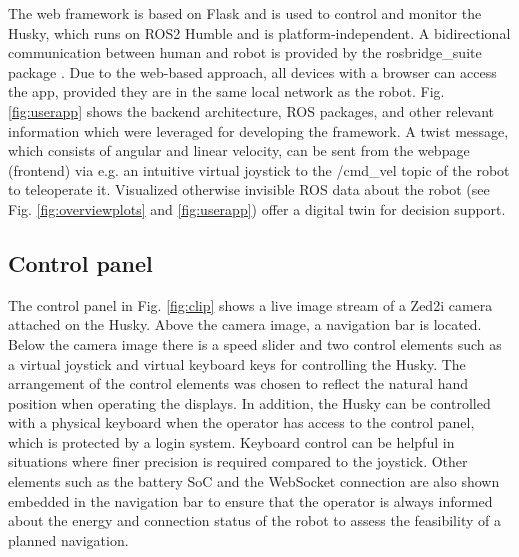 \documentclass[letterpaper, 10 pt, conference]{ieeeconf}  %
\begin{document}
The web framework is based on Flask \cite{flask} and is used to control and monitor the Husky, which runs on ROS2 Humble and is platform-independent. A
bidirectional communication between human and robot is provided by the rosbridge\_suite package \cite{rosbridgeSuite}.   
Due to the web-based approach, all devices with a browser can access the app, provided they are in the same local network as the robot.
Fig. \ref{fig:userapp} shows the backend architecture, ROS packages, and other relevant information which were leveraged for developing the framework. 
A twist message, which consists of angular and linear velocity, can be sent from the webpage (frontend) via e.g. 
an intuitive virtual joystick to the /cmd\_vel topic of the robot to teleoperate it. Visualized otherwise invisible ROS data about the robot (see Fig. \ref{fig:overviewplots} and \ref{fig:userapp}) offer a digital twin for decision support.



\subsection{Control panel}
The control panel in Fig. \ref{fig:clip} shows a live image stream of a Zed2i camera attached on the Husky. Above the camera image, a navigation bar is located. 
Below the camera image there is a speed slider and two control elements such as a virtual joystick and virtual keyboard keys for controlling the Husky. The arrangement of the control elements was chosen to reflect the natural hand position when operating the displays.
In addition, the Husky can be controlled with a physical keyboard when the operator has access to the control panel, which is protected by a login system. Keyboard control can be helpful in situations where finer precision is required compared to the joystick.
Other elements such as the battery SoC and the WebSocket connection are also shown embedded in the navigation bar to ensure that the operator is always informed about the energy and connection status of the robot to assess the feasibility of a planned navigation.
\end{document}
